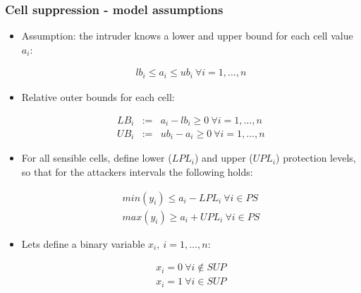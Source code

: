 \begin{frame}\frametitle{Cell suppression - model assumptions}
	\begin{itemize}
		\item Assumption: the intruder knows a lower and upper bound for each cell value $a_i$:
		\begin{scriptsize} \begin{eqnarray*}
			lb_i \leq a_i \leq ub_i ~ \forall i=1,\ldots,n
		\end{eqnarray*}	\end{scriptsize} \pause

		\vspace{-0.15cm}
		\item Relative outer bounds for each cell:
		\vspace{-0.15cm}
		\begin{scriptsize}	\begin{eqnarray*}
			LB_i &:=& a_i - lb_i \geq 0 ~ \forall i=1,\ldots,n \\
			UB_i &:=& ub_i - a_i \geq 0 ~ \forall i=1,\ldots,n
		\end{eqnarray*}	\end{scriptsize} \pause

		\vspace{-0.15cm}
		\item 
		For all sensible cells, define lower ($LPL_i$) and upper ($UPL_i$) protection levels, so that for the attackers intervals the following holds:
		\vspace{-0.15cm}
		\begin{scriptsize}
		\begin{eqnarray*}
			min(y_i) \leq a_i - LPL_i ~  \forall i \in PS \\
			max(y_i) \geq a_i + UPL_i ~  \forall i \in PS
		\end{eqnarray*}
		\end{scriptsize} \pause

		\vspace{-0.15cm}
		\item Lets define a binary variable $x_i, ~ i=1,\ldots,n$:
		\begin{scriptsize} \begin{eqnarray*}
			x_i = 0 ~  \forall i \notin SUP \\
			x_i = 1 ~  \forall i \in SUP
		\end{eqnarray*}	\end{scriptsize}
	\end{itemize}
\end{frame}


